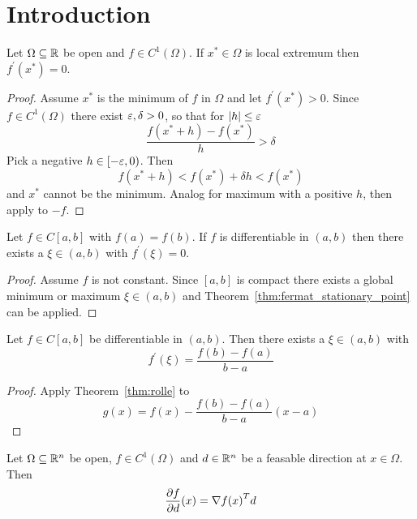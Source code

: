 
\newpage
\section{Introduction}

\begin{theorem}\label{thm:fermat_stationary_point}
Let \( \Omega \subseteq \mathbb{R} \) be open and \( f \in C^1(\Omega) \). If \( x^* \in \Omega \) is local extremum 
then \( f^\prime(x^*) = 0 \).
\end{theorem}

\begin{proof}
Assume \( x^* \) is the minimum of \( f \) in \( \Omega \) and let \( f^\prime(x^*) > 0 \). 
Since \( f \in C^1(\Omega) \) there exist \( \varepsilon, \delta > 0 \), so that for \( |h| \le \varepsilon \)
\[
    \frac{f(x^* + h) - f(x^*)}{h} > \delta
\]
Pick a negative \( h \in [-\varepsilon, 0) \). Then 
\[
     f(x^* + h) < f(x^*) +  \delta h < f(x^*) 
\]
and \( x^* \) cannot be the minimum. Analog for maximum with a positive \( h \), then apply to \( -f \).
\end{proof}
\bigskip


\begin{theorem}[Rolle]\label{thm:rolle}
Let \( f \in C[a,b] \) with \( f(a) = f(b) \). If \( f \) is differentiable in \( (a, b) \) then 
there exists a \( \xi \in (a,b) \) with \( f^\prime(\xi) = 0 \).
\end{theorem}

\begin{proof}
Assume \( f \) is not constant. Since \( [a,b] \) is compact there exists a global minimum or maximum 
\( \xi \in (a,b) \) and Theorem~\ref{thm:fermat_stationary_point} can be applied.
\end{proof}
\bigskip


\begin{theorem}\label{thm:mean_value}
Let \( f \in C[a,b] \) be differentiable in \( (a, b) \). Then there exists a \( \xi \in (a,b) \) with 
\[
    f^\prime(\xi) = \frac{f(b) - f(a)}{b - a}
\]
\end{theorem}

\begin{proof}
Apply Theorem~\ref{thm:rolle} to 
\[
    g(x) = f(x) - \frac{f(b) - f(a)}{b - a} (x -a) 
\]
\end{proof}
\bigskip


\begin{lemma}\label{lemma:direction_derivative}
Let \( \Omega \subseteq \mathbb{R}^n \) be open, \( f \in C^1(\Omega) \) and \( d \in \mathbb{R}^n \) be a feasable direction 
at \( x \in \Omega \). Then
\[
    \frac{\partial f}{\partial d}(x) = \nabla{f(x)}^T d
\] 
\end{lemma}
\bigskip


